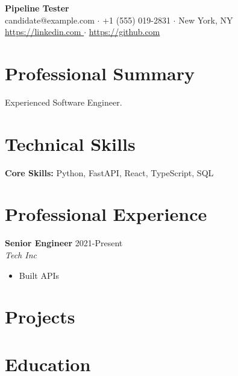 \documentclass[11pt,a4paper]{article}
\begin{document}
\begin{center}
    {\Large \textbf{ Pipeline Tester }} \\
    \vspace{2pt}
    \small candidate@example.com $\cdot$ +1 (555) 019-2831 $\cdot$ New York, NY \\
    \small \url{ https://linkedin.com } $\cdot$ \url{ https://github.com }
\end{center}

\vspace{-10pt}

\section*{Professional Summary}
Experienced Software Engineer.

\section*{Technical Skills}
\textbf{Core Skills:} Python, FastAPI, React, TypeScript, SQL

\section*{Professional Experience}

\noindent \textbf{ Senior Engineer } \hfill 2021-Present \\
\textit{ Tech Inc } \hfill \textit{  }
\begin{itemize}[leftmargin=1.5em, noitemsep, topsep=2pt]
    
    \item Built APIs
    
\end{itemize}
\vspace{4pt}


\section*{Projects}


\section*{Education}
\end{document}
